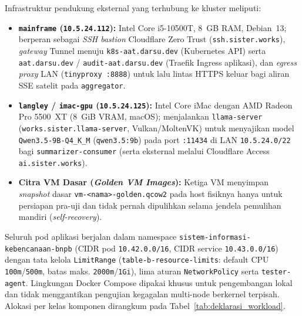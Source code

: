 \noindent Infrastruktur pendukung eksternal yang terhubung ke kluster meliputi:
\begin{itemize}
    \item \textbf{\texttt{mainframe} (\texttt{10.5.24.112}):} Intel Core i5-10500T, 8~GB RAM, Debian~13; berperan sebagai \textit{SSH bastion} Cloudflare Zero Trust (\texttt{ssh.sister.works}), \textit{gateway} Tunnel menuju \texttt{k8s-aat.darsu.dev} (Kubernetes API) serta \texttt{aat.darsu.dev} / \texttt{audit-aat.darsu.dev} (Traefik Ingress aplikasi), dan \textit{egress proxy} LAN (\texttt{tinyproxy :8888}) untuk lalu lintas HTTPS keluar bagi aliran SSE satelit pada \texttt{aggregator}.
    \item \textbf{\texttt{langley} / \texttt{imac-gpu} (\texttt{10.5.24.125}):} Intel Core iMac dengan AMD Radeon Pro 5500~XT (8~GiB VRAM, macOS); menjalankan \texttt{llama-server} (\texttt{works.sister.llama-server}, Vulkan/\allowbreak MoltenVK) untuk menyajikan model \texttt{Qwen3.5-9B-\allowbreak Q4\_K\_M} (\texttt{qwen3.5:9b}) pada port \texttt{:11434} di LAN \texttt{10.5.24.0/22} bagi \texttt{summarizer-consumer} (serta eksternal melalui Cloudflare Access \texttt{ai.sister.works}).
    \item \textbf{Citra VM Dasar (\textit{Golden VM Images}):} Ketiga VM menyimpan \textit{snapshot} dasar \texttt{vm-<nama>-golden.qcow2} pada host fisiknya hanya untuk persiapan pra-uji dan tidak pernah dipulihkan selama jendela pemulihan mandiri (\textit{self-recovery}).
\end{itemize}

\vspace{1em}

\noindent Seluruh pod aplikasi berjalan dalam namespace \texttt{sistem-informasi-\allowbreak kebencanaan-bnpb} (CIDR pod \texttt{10.42.0.0/16}, CIDR service \texttt{10.43.0.0/16}) dengan tata kelola \texttt{LimitRange} (\texttt{table-b-resource-limits}: default CPU \texttt{100m}/\texttt{500m}, batas maks. \texttt{2000m}/\texttt{1Gi}), lima aturan \texttt{NetworkPolicy} serta \texttt{tester-agent}. Lingkungan Docker Compose dipakai khusus untuk pengembangan lokal dan tidak menggantikan pengujian kegagalan multi-node berkernel terpisah. Alokasi per kelas komponen dirangkum pada Tabel~\ref{tab:deklarasi_workload}.

